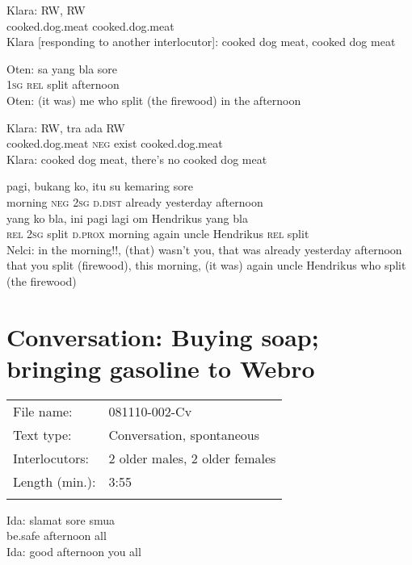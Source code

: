 \ea
\gll   Klara:   RW,   RW\\
 {}  cooked.dog.meat   cooked.dog.meat\\
\glt
Klara [responding to another interlocutor]: cooked dog meat, cooked dog meat
\z

\ea
\gll   Oten:   sa   yang   bla   sore\\
 {}  \textsc{1sg}   \textsc{rel}   split   afternoon\\
\glt
Oten: (it was) me who split (the firewood) in the afternoon
\z

\ea
\gll   Klara:   RW,   tra   ada   RW\\
 {}     cooked.dog.meat   \textsc{neg}   exist   cooked.dog.meat\\
\glt
Klara: cooked dog meat, there’s no cooked dog meat
\z

\ea
{}    {pagi,}    {bukang}   ko,    {itu}    {su}    {kemaring}    {sore}\\
   {}    {morning}    {\textsc{neg}}   \textsc{2sg}    {\textsc{d.dist}}    {already}    {yesterday}    {afternoon}\\
\gll yang    {ko}   bla,    {ini}    {pagi}    {lagi}   om    {Hendrikus}    {yang}   bla\\
  \textsc{rel}    {\textsc{2sg}}   split    {\textsc{d.prox}}    {morning}    {again}   uncle    {Hendrikus}    {\textsc{rel}}   split\\
\glt
Nelci: in the morning!!, (that) wasn’t you, that was already yesterday afternoon that you split (firewood), this morning, (it was) again uncle Hendrikus who split (the firewood)
\z
\section{Conversation: Buying soap; bringing gasoline to Webro}
\label{Para_B.2}
\begin{tabular}{ll}
\lsptoprule
File name: &  081110-002-Cv\\
Text type: & Conversation, spontaneous\\
Interlocutors: & 2 older males, 2 older females\\
Length (min.): & 3:55\\
\lspbottomrule
\end{tabular}
\setcounter{equation}{0}
\ea
\gll   Ida:   slamat   sore   smua\\
  {}   be.safe   afternoon   all\\
\glt
Ida: good afternoon you all
\z

